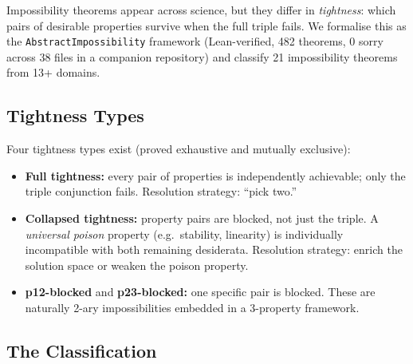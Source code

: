 \documentclass[11pt,a4paper]{article}
\begin{document}
Impossibility theorems appear across science, but they differ in \emph{tightness}: which pairs of desirable properties survive when the full triple fails.  We formalise this as the \texttt{AbstractImpossibility} framework (Lean-verified, 482 theorems, 0 sorry across 38 files in a companion repository) and classify 21 impossibility theorems from 13+ domains.

\subsection{Tightness Types}

Four tightness types exist (proved exhaustive and mutually exclusive):
\begin{itemize}
  \item \textbf{Full tightness:} every pair of properties is independently achievable; only the triple conjunction fails.  Resolution strategy: ``pick two.''
  \item \textbf{Collapsed tightness:} property pairs are blocked, not just the triple.  A \emph{universal poison} property (e.g.\ stability, linearity) is individually incompatible with both remaining desiderata.  Resolution strategy: enrich the solution space or weaken the poison property.
  \item \textbf{p12-blocked} and \textbf{p23-blocked:} one specific pair is blocked.  These are naturally 2-ary impossibilities embedded in a 3-property framework.
\end{itemize}

\subsection{The Classification}
\end{document}
